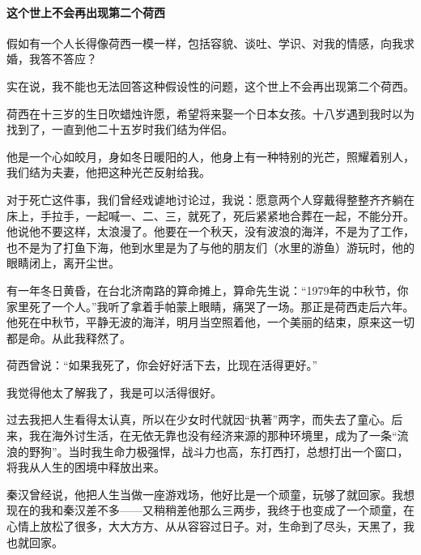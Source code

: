\paragraph*{这个世上不会再出现第二个荷西}
\par 假如有一个人长得像荷西一模一样，包括容貌、谈吐、学识、对我的情感，向我求婚，我答不答应？
\par 实在说，我不能也无法回答这种假设性的问题，这个世上不会再出现第二个荷西。
\par 荷西在十三岁的生日吹蜡烛许愿，希望将来娶一个日本女孩。十八岁遇到我时以为找到了，一直到他二十五岁时我们结为伴侣。
\par 他是一个心如皎月，身如冬日暖阳的人，他身上有一种特别的光芒，照耀着别人，我们结为夫妻，他把这种光芒反射给我。
\par 对于死亡这件事，我们曾经戏谑地讨论过，我说：愿意两个人穿戴得整整齐齐躺在床上，手拉手，一起喊一、二、三，就死了，死后紧紧地合葬在一起，不能分开。他说他不要这样，太浪漫了。他要在一个秋天，没有波浪的海洋，不是为了工作，也不是为了打鱼下海，他到水里是为了与他的朋友们（水里的游鱼）游玩时，他的眼睛闭上，离开尘世。
\par 有一年冬日黄昏，在台北济南路的算命摊上，算命先生说：“1979年的中秋节，你家里死了一个人。”我听了拿着手帕蒙上眼睛，痛哭了一场。那正是荷西走后六年。他死在中秋节，平静无波的海洋，明月当空照着他，一个美丽的结束，原来这一切都是命。从此我释然了。
\par 荷西曾说：“如果我死了，你会好好活下去，比现在活得更好。”
\par 我觉得他太了解我了，我是可以活得很好。
\par 过去我把人生看得太认真，所以在少女时代就因“执著”两字，而失去了童心。后来，我在海外讨生活，在无依无靠也没有经济来源的那种环境里，成为了一条“流浪的野狗”。当时我生命力极强悍，战斗力也高，东打西打，总想打出一个窗口，将我从人生的困境中释放出来。
\par 秦汉曾经说，他把人生当做一座游戏场，他好比是一个顽童，玩够了就回家。我想现在的我和秦汉差不多——又稍稍差他那么三两步，我终于也变成了一个顽童，在心情上放松了很多，大大方方、从从容容过日子。对，生命到了尽头，天黑了，我也就回家。

